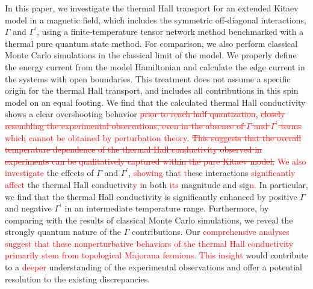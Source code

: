 \documentclass[twocolumn,superscriptaddress,showpacs, longbibliography, aps, prx]{revtex4-2}
\newcommand{\red}[1]{\textcolor{red}{#1}}
\newcommand{\redsout}[1]{\textcolor{red}{\sout{#1}}}
\begin{document}
In this paper, we investigate the thermal Hall transport for an extended Kitaev model in a magnetic field, which includes the symmetric off-diagonal interactions, $\Gamma$ and $\Gamma^\prime$, using a finite-temperature tensor network method benchmarked with a thermal pure quantum state method. 
For comparison, we also perform classical Monte Carlo simulations in the classical limit of the model. 
We properly define the energy current from the model Hamiltonian and calculate the edge current in the systems with open boundaries. 
This treatment does not assume a specific origin for the thermal Hall transport, and includes all contributions in this spin model on an equal footing. 
We find that the calculated thermal Hall conductivity shows a clear overshooting behavior\redsout{ prior to reach half quantization}, \redsout{closely resembling the experimental observations, even in the absence of $\Gamma$ and $\Gamma^\prime$ terms} \red{which cannot be obtained by perturbation theory}. 
\redsout{This suggests that the overall temperature dependence of the thermal Hall conductivity observed in experiments can be qualitatively captured within the pure Kitaev model.} 
\red{We also investigate} the effects of $\Gamma$ and $\Gamma^\prime$, %
\red{showing} tha\red{t %
t}hese interactions %
\red{significantly affect} the thermal Hall conductivit\red{y %
i}n both \red{its} magnitude and sig\red{n.} %
In particular, we find that the thermal Hall conductivity is significantly enhanced by positive $\Gamma$ and negative $\Gamma^\prime$ in an intermediate temperature range. 
Furthermore, by comparing with the results of classical Monte Carlo simulations, we reveal the strongly quantum nature of the $\Gamma$ contributions. 
Our %
\red{comprehensive analyses suggest that these nonperturbative behaviors of the thermal Hall conductivity primarily stem from topological Majorana fermions. 
This insight} would contribute to a %
\red{deeper} understanding of the experimental observations and offer a potential resolution to the existing discrepancies. 
\end{document}
